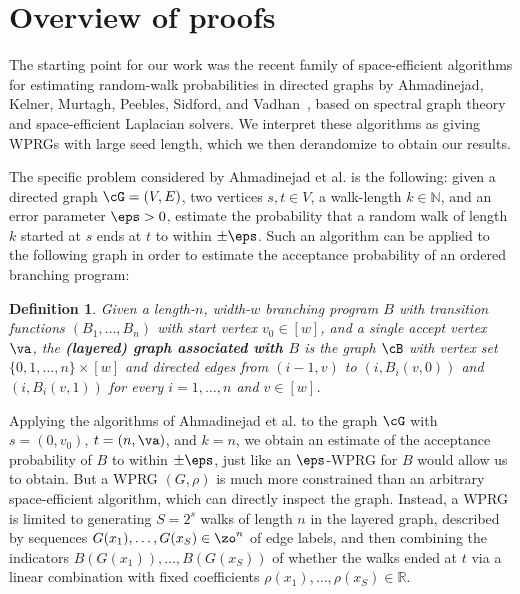 \documentclass[11pt]{article}
\newtheorem{definition}[theorem]{Definition}
\newcommand{\R}{{\mathbb R}}
\newcommand{\N}{{\mathbb N}}
\begin{document}
\section{Overview of proofs}
The starting point for our %
%
work was %
the recent
family of %
%
%
space-efficient algorithms for estimating
random-walk probabilities in directed graphs by
%
Ahmadinejad, %
Kelner, Murtagh,
Peebles, Sidford, and Vadhan~\cite{AhmadinejadKeMuPeSiVa19}, %
%
based on spectral graph
theory and space-efficient Laplacian solvers. 
    We interpret these algorithms as giving WPRGs with large seed length, which we then derandomize to obtain our results.  
    
    The specific problem considered by %
Ahmadinejad  %
et al. is the following: given a directed graph $\cG=(V,E)$, two vertices $s,t\in V$, a walk-length $k\in \N$, and an error parameter $\eps>0$, estimate the probability that a random walk of length $k$ started at $s$ ends at $t$ to within $\pm \eps$.  Such an algorithm can be applied to the following graph in order to estimate the acceptance probability of an ordered branching program:
    \begin{definition} \label{def:OBP_graph}
%
Given a length-$n$, width-$w$    %
branching program $B$ with transition functions $(B_1,\ldots,B_n)$ with start vertex $v_0\in [w]$, and a single accept vertex $\va$, the \textbf{(layered) graph associated with $B$} is the graph $\cB$ with vertex set $\{0,1,\ldots,n\}\times[w]$ and directed edges from $(i-1,v)$ to
        $(i,B_i(v,0))$ and $(i,B_i(v,1))$ for every $i=1,\ldots,n$ and $v\in [w]$.
    \end{definition} 
    Applying the algorithms of %
Ahmadinejad  %
et al. to the graph $\cG$ with $s=(0,v_0)$, $t=(n,\va)$, and $k=n$, we obtain an estimate of the acceptance probability of $B$ to within $\pm \eps$, just like an $\eps$-WPRG for $B$ would allow us to obtain. But a WPRG $(G,\rho)$ is much more constrained than an arbitrary space-efficient algorithm, which can directly inspect the graph. Instead, a WPRG is limited to generating $S=2^s$ walks of length $n$ in the layered graph, described by sequences $G(x_1),\ldots, G(x_S)\in \zo^n$ of edge labels, and then combining the indicators $B(G(x_1)),\ldots,B(G(x_S))$ of whether the walks ended at $t$ via a linear combination with fixed coefficients $\rho(x_1),\ldots,\rho(x_S)\in \R$.
    
\end{document}
